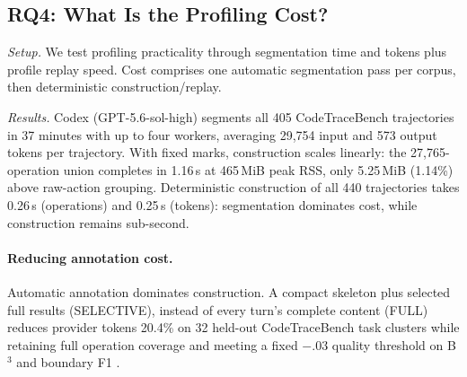 \documentclass[sigconf,nonacm]{acmart}
\newif\ifshowappendix
\newcommand{\appnote}[1]{\ifshowappendix{} (#1)\fi}
\begin{document}
\subsection{RQ4: What Is the Profiling Cost?}

\emph{Setup.} We test profiling practicality through segmentation time and tokens plus profile replay speed. Cost comprises one automatic segmentation pass per corpus, then deterministic construction/replay.

\emph{Results.} Codex (GPT-5.6-sol-high) segments all 405 CodeTraceBench trajectories in 37 minutes with up to four workers, averaging 29{,}754 input and 573 output tokens per trajectory.
With fixed marks, construction scales linearly: the 27{,}765-operation union completes in 1.16\,s at 465\,MiB peak RSS, only 5.25\,MiB (1.14\%) above raw-action grouping\appnote{details in Appendix~\ref{app:rq4-cost}}.
Deterministic construction of all 440 trajectories takes 0.26\,s (operations) and 0.25\,s (tokens): segmentation dominates cost, while construction remains sub-second.

\paragraph{Reducing annotation cost.}
Automatic annotation dominates construction. A compact skeleton plus
selected full results (SELECTIVE), instead of every turn's
complete content (FULL) reduces provider tokens 20.4\% on 32 held-out
CodeTraceBench task clusters while retaining full operation coverage and
meeting a fixed $-.03$ quality threshold on B$^3$ and boundary F1
\appnote{details in Appendix~\ref{app:rq4-selective}}.
\end{document}
